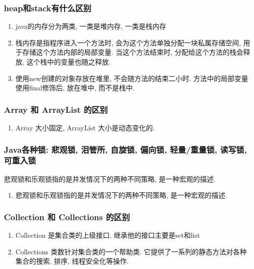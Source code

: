 \documentclass[UTF8]{ctexart}
\begin{document}
	\subsubsection{heap和stack有什么区别}
	\begin{enumerate}
		\item java的内存分为两类, 一类是堆内存, 一类是栈内存
		\item 栈内存是指程序进入一个方法时, 会为这个方法单独分配一块私属存储空间, 用于存储这个方法内部的局部变量. 当这个方法结束时, 分配给这个方法的栈会释放, 这个栈中的变量也随之释放.
		\item 使用new创建的对象存放在堆里, 不会随方法的结束二小时. 方法中的局部变量使用final修饰后, 放在堆中, 而不是栈中.
		
	\end{enumerate}

	\subsubsection{Array 和 ArrayList 的区别}
	\begin{enumerate}
		\item Array 大小固定, ArrayList 大小是动态变化的.
	\end{enumerate}
\subsubsection{Java各种锁: 悲观锁, 泪管所, 自旋锁, 偏向锁, 轻量/重量锁, 读写锁, 可重入锁}
悲观锁和乐观锁指的是并发情况下的两种不同策略, 是一种宏观的描述.
\par

\begin{enumerate}
	\item 悲观锁和乐观锁指的是并发情况下的两种不同策略, 是一种宏观的描述.
	
\end{enumerate}
\subsubsection{Collection 和 Collections 的区别}
\begin{enumerate}
	\item Collection 是集合类的上级接口, 继承他的接口主要是set和list
	\item Collections 类数针对集合类的一个帮助类. 它提供了一系列的静态方法对各种集合的搜索, 排序, 线程安全化等操作.
\end{enumerate}
\end{document}
